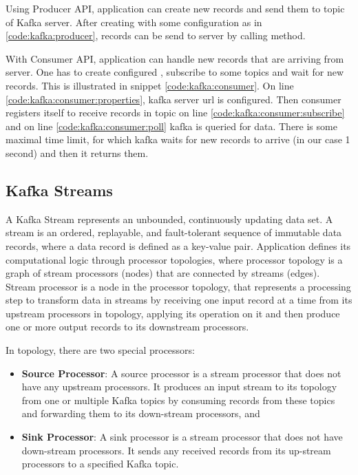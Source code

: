 Using Producer API, application can create new records and send them to topic of Kafka server.
After creating  with some configuration as in \ref{code:kafka:producer},
records can be send to server by calling  method.

With Consumer API, application can handle new records that are arriving from server.
One has to create configured , subscribe to some topics
and wait for new records. This is illustrated in snippet \ref{code:kafka:consumer}.
On line \ref{code:kafka:consumer:properties}, kafka server url is configured.
Then consumer registers itself to receive records in topic 
on line \ref{code:kafka:consumer:subscribe} and on line \ref{code:kafka:consumer:poll}
kafka is queried for data. There is some maximal time limit, for which kafka waits for
new records to arrive (in our case 1 second) and then it returns them.



\subsection{Kafka Streams}

A Kafka Stream represents an unbounded, continuously updating data set.
A stream is an ordered, replayable, and fault-tolerant sequence of immutable data records,
where a data record is defined as a key-value pair.
Application defines its computational logic through processor topologies,
where processor topology is a graph of stream processors (nodes) that are
connected by streams (edges).
Stream processor is a node in the processor topology, that represents
a processing step to transform data in streams by receiving one
input record at a time from its upstream processors in topology,
applying its operation on it and then produce one or more
output records to its downstream processors.

In topology, there are two special processors:
\begin{itemize}
  \item \textbf{Source Processor}: A source processor is a stream processor
    that does not have any upstream processors. It produces an input stream
    to its topology from one or multiple Kafka topics by consuming records
    from these topics and forwarding them to its down-stream processors, and
  \item \textbf{Sink Processor}: A sink processor is a stream processor
    that does not have down-stream processors. It sends any received records
    from its up-stream processors to a specified Kafka topic.
\end{itemize}

